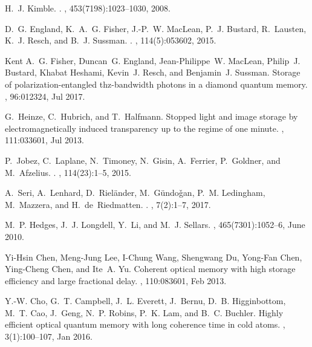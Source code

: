 \documentclass[%
 reprint,
 amsmath,amssymb,
 aps,
 pra,
]{revtex4-1}
\begin{document}

\begin{thebibliography}{10}

H.~J. Kimble.
.
, 453(7198):1023--1030, 2008.

D.~G. England, K.~A.~G. Fisher, J.-P.~W. MacLean, P.~J. Bustard, R.~Lausten,
  K.~J. Resch, and B.~J. Sussman.
.
, 114(5):053602, 2015.

Kent A.~G. Fisher, Duncan~G. England, Jean-Philippe~W. MacLean, Philip~J.
  Bustard, Khabat Heshami, Kevin~J. Resch, and Benjamin~J. Sussman.
\newblock Storage of polarization-entangled thz-bandwidth photons in a diamond
  quantum memory.
, 96:012324, Jul 2017.

G.~Heinze, C.~Hubrich, and T.~Halfmann.
\newblock Stopped light and image storage by electromagnetically induced
  transparency up to the regime of one minute.
, 111:033601, Jul 2013.

P.~Jobez, C.~Laplane, N.~Timoney, N.~Gisin, A.~Ferrier, P.~Goldner, and
  M.~Afzelius.
.
, 114(23):1--5, 2015.

A.~Seri, A.~Lenhard, D.~Riel\"{a}nder, M.~G\"{u}ndo{\v g}an, P.~M. Ledingham,
  M.~Mazzera, and H.~de~Riedmatten.
.
, 7(2):1--7, 2017.

M.~P. Hedges, J.~J. Longdell, Y.~Li, and M.~J. Sellars.
, 465(7301):1052--6, June 2010.

Yi-Hsin Chen, Meng-Jung Lee, I-Chung Wang, Shengwang Du, Yong-Fan Chen,
  Ying-Cheng Chen, and Ite~A. Yu.
\newblock Coherent optical memory with high storage efficiency and large
  fractional delay.
, 110:083601, Feb 2013.

Y.-W. Cho, G.~T. Campbell, J.~L. Everett, J.~Bernu, D.~B. Higginbottom, M.~T.
  Cao, J.~Geng, N.~P. Robins, P.~K. Lam, and B.~C. Buchler.
\newblock Highly efficient optical quantum memory with long coherence time in
  cold atoms.
, 3(1):100--107, Jan 2016.


\end{thebibliography}
\end{document}
